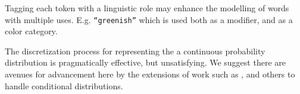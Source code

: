 \documentclass[11pt,a4paper]{article}
\newcommand{\textcite}{\cite}
\begin{document}
Tagging each token with a linguistic role may enhance the modelling of words with multiple uses. E.g. \texttt{``greenish''} which is used both as a modifier, and as a color category.

The discretization process for representing the a continuous probability distribution is pragmatically effective, but unsatisfying.
We suggest there are avenues for advancement here by the extensions of work such as \textcite{1998NNpdfDiffCdf}, \textcite{likas2001probability} and others to handle conditional distributions.


\clearpage


\clearpage
\appendix


\end{document}

